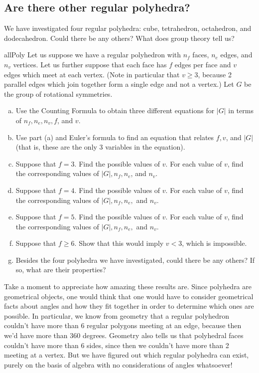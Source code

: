 \subsection{Are there other regular polyhedra?}
\label{subsec:GroupActions:SymmetryOfPolyhedra:AreTheirOthers}

We have investigated four regular polyhedra: cube, tetrahedron, octahedron, and dodecahedron.  Could there be any others?  What does group theory tell us? 


\begin{exercise}{allPoly}
Let us suppose we have a regular polyhedron with $n_f$ faces, $n_e$ edges, and $n_v$ vertices.  Let us further suppose that each face has $f$ edges per face and $v$ edges which meet at each vertex. (Note in particular that $v \ge 3$, because 2 parallel edges which join together form a single edge and not a vertex.) Let $G$ be the group of rotational symmetries.
\begin{enumerate}[(a)]
\item
Use the Counting Formula to obtain three different equations for $|G|$ in terms of $n_f, n_e, n_v, f$, and $v$.
\item
Use part (a) and Euler's formula to find an equation that relates $f, v$, and $|G|$ (that is, these are the only 3 variables in the equation).
\item
Suppose that $f=3$.  Find the possible values of $v$.  For each value of $v$, find the corresponding values of $|G|, n_f, n_e$, and $n_v$.
\item
Suppose that $f=4$.  Find the possible values of $v$.  For each value of $v$, find the corresponding values of $|G|, n_f, n_e,$ and $n_v$.
\item
Suppose that $f=5$.  Find the possible values of $v$.  For each value of $v$, find the corresponding values of $|G|, n_f, n_e,$ and $n_v$.
\item
Suppose that $f \ge 6$. Show that this would imply $v<3$, which is impossible.
\item
Besides the four polyhedra we have investigated, could there be any others? If so, what are their properties?
\end{enumerate}
\end{exercise}

Take a moment to appreciate how amazing these results are.  Since polyhedra are geometrical objects, one would think that one would have to consider geometrical facts about angles and how they fit together in order to determine which ones are possible.  In particular, we know from geometry that a regular polyhedron couldn't have more than 6 regular polygons meeting at an edge, because then we'd have more than 360 degrees. Geometry also tells us that polyhedral faces couldn't have more than 6 sides, since then we couldn't have more than 2 meeting at a vertex. But we have figured out which regular polyhedra can exist, purely on the basis of algebra with no considerations of angles whatsoever!  

